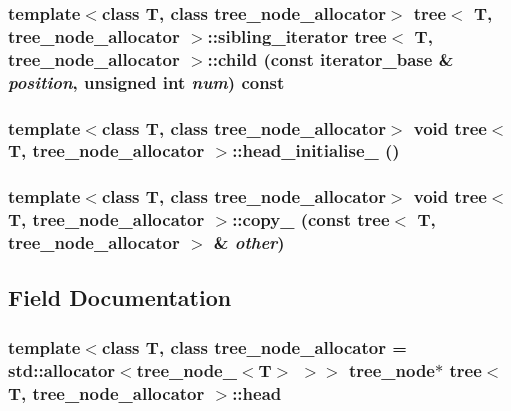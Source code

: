 \hypertarget{classtree_446c722c82607f8b3243a9153b665d19}{
\subsubsection{\setlength{\rightskip}{0pt plus 5cm}template$<$class T, class tree\_\-node\_\-allocator$>$ {\bf tree}$<$ T, tree\_\-node\_\-allocator $>$::{\bf sibling\_\-iterator} {\bf tree}$<$ T, tree\_\-node\_\-allocator $>$::child (const {\bf iterator\_\-base} \& {\em position}, \/  unsigned int {\em num}) const}}
\label{classtree_446c722c82607f8b3243a9153b665d19}


\hypertarget{classtree_5840b048b937d8f4f1d55c4aef948a58}{
\subsubsection{\setlength{\rightskip}{0pt plus 5cm}template$<$class T, class tree\_\-node\_\-allocator$>$ void {\bf tree}$<$ T, tree\_\-node\_\-allocator $>$::head\_\-initialise\_\- ()}}
\label{classtree_5840b048b937d8f4f1d55c4aef948a58}


\hypertarget{classtree_35df9f0f8fef4c86ef70cad0027b7454}{
\subsubsection{\setlength{\rightskip}{0pt plus 5cm}template$<$class T, class tree\_\-node\_\-allocator$>$ void {\bf tree}$<$ T, tree\_\-node\_\-allocator $>$::copy\_\- (const {\bf tree}$<$ T, tree\_\-node\_\-allocator $>$ \& {\em other})}}
\label{classtree_35df9f0f8fef4c86ef70cad0027b7454}




\subsection{Field Documentation}
\hypertarget{classtree_10991cbf1497e125c0ef04d6e292e32b}{
\subsubsection{\setlength{\rightskip}{0pt plus 5cm}template$<$class T, class tree\_\-node\_\-allocator = std::allocator$<$tree\_\-node\_\-$<$T$>$ $>$$>$ {\bf tree\_\-node}$\ast$ {\bf tree}$<$ T, tree\_\-node\_\-allocator $>$::{\bf head}}}
\label{classtree_10991cbf1497e125c0ef04d6e292e32b}


